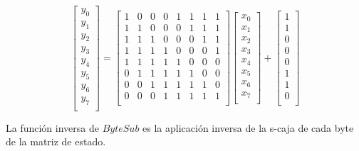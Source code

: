 \begin{description}
\begin{enumerate}
				\begin{equation*} 
					\begin{bmatrix} 
						y_0\\
						y_1\\
						y_2\\
						y_3\\
						y_4\\
						y_5\\
						y_6\\
						y_7\\
					\end{bmatrix}
					=
					\begin{bmatrix} %
						1 & 0 & 0 & 0 & 1 & 1 & 1 & 1\\
						1 & 1 & 0 & 0 & 0 & 1 & 1 & 1\\
						1 & 1 & 1 & 0 & 0 & 0 & 1 & 1\\
						1 & 1 & 1 & 1 & 0 & 0 & 0 & 1\\
						1 & 1 & 1 & 1 & 1 & 0 & 0 & 0\\
						0 & 1 & 1 & 1 & 1 & 1 & 0 & 0\\
						0 & 0 & 1 & 1 & 1 & 1 & 1 & 0\\
						0 & 0 & 0 & 1 & 1 & 1 & 1 & 1\\
					\end{bmatrix}
					\begin{bmatrix}
						x_0\\
						x_1\\
						x_2\\
						x_3\\
						x_4\\
						x_5\\
						x_6\\
						x_7\\
					\end{bmatrix}
					+
					\begin{bmatrix}
						1\\
						1\\
						0\\
						0\\
						0\\
						1\\
						1\\
						0\\
					\end{bmatrix}
			\end{equation*}
		\end{enumerate}
		La función inversa de $ByteSub$ es la aplicación inversa de la s-caja de cada byte de la matriz de estado.


\end{description}
